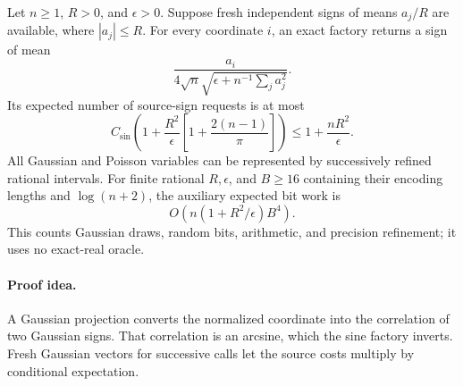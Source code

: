 \begin{theorem}
\label{thm:gaussianrms}
Let $n\ge1$, $R>0$, and $\epsilon>0$. Suppose fresh independent
signs of means $a_j/R$ are available, where $|a_j|\le R$.
For every coordinate $i$, an exact factory returns a sign of mean
\[
 \frac{a_i}{4\sqrt n\sqrt{\epsilon+n^{-1}\sum_j a_j^2}}.
\]
Its expected number of source-sign requests is at most
\begin{equation}
 C_{\sin}\left(1+\frac{R^2}{\epsilon}
      \left[1+\frac{2(n-1)}\pi\right]\right)
 \le1+\frac{nR^2}{\epsilon}.
 \label{eq:gaussianrmscost}
\end{equation}
All Gaussian and Poisson variables can be represented by successively
refined rational intervals. For finite rational $R,\epsilon$, and
$B\ge16$ containing their encoding lengths and $\log(n+2)$, the
auxiliary expected bit work is
\[
 O\!\left(n(1+R^2/\epsilon)B^4\right).
\]
This counts Gaussian draws, random bits, arithmetic, and precision
refinement; it uses no exact-real oracle.
\end{theorem}
\paragraph{Proof idea.}
A Gaussian projection converts the normalized coordinate into the
correlation of two Gaussian signs. That correlation is an arcsine, which
the sine factory inverts. Fresh Gaussian vectors for successive calls let
the source costs multiply by conditional expectation.


